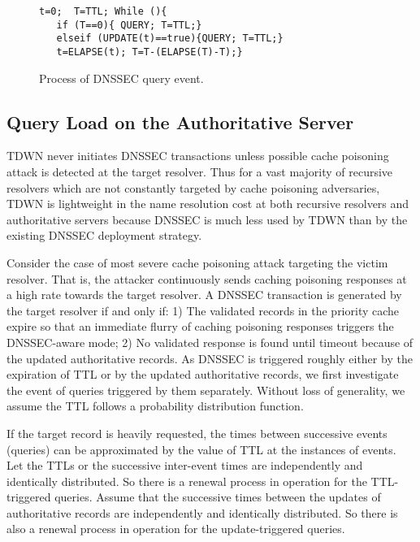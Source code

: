 \documentclass[conference]{IEEEtran}
\begin{document}
\begin{figure}[!t]
\centering
\scriptsize{
\begin{Verbatim}[frame=single]
t=0;  T=TTL; While (){
   if (T==0){ QUERY; T=TTL;}
   elseif (UPDATE(t)==true){QUERY; T=TTL;}
   t=ELAPSE(t); T=T-(ELAPSE(T)-T);} \end{Verbatim}
}
\vspace{-1em}
\caption{Process of DNSSEC query event.}
\vspace{-2em}
\end{figure}



\subsection{Query Load on the Authoritative Server}

TDWN never initiates DNSSEC transactions unless possible cache poisoning attack is detected at the target resolver. Thus for a vast majority of recursive resolvers which are not constantly targeted by cache poisoning adversaries, TDWN is lightweight in the name resolution cost at both recursive resolvers and authoritative servers because DNSSEC is much less used by TDWN than by the existing DNSSEC deployment strategy.


Consider the case of most severe cache poisoning attack targeting the victim resolver. That is, the attacker continuously sends caching poisoning responses at a high rate towards the target resolver. A DNSSEC transaction is generated by the target resolver if and only if: 1) The validated records in the priority cache expire so that an immediate flurry of caching poisoning responses triggers the DNSSEC-aware mode; 2) No validated response is found until timeout because of the updated authoritative records. As DNSSEC is triggered roughly either by the expiration of TTL or by the updated authoritative records, we first investigate the event of queries triggered by them separately. Without loss of generality, we assume the TTL follows a probability distribution function.


If the target record is heavily requested, the times between successive events (queries) can be approximated by the value of TTL at the instances of events. Let the TTLs or the successive inter-event times are independently and identically distributed. So there is a renewal process in operation for the TTL-triggered queries. Assume that the successive times between the updates of authoritative records are independently and identically distributed. So there is also a renewal process in operation for the update-triggered queries.
\end{document}
